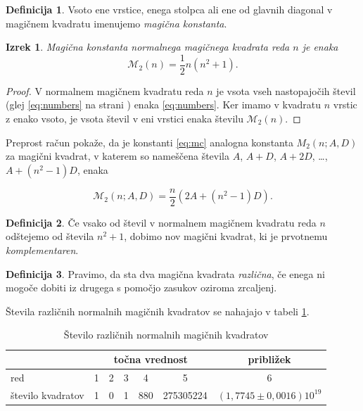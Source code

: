 \documentclass[a4paper,12pt]{article}
\newcommand{\m}{\mathcal{M}_2}
\theoremstyle{definition}
\newtheorem{definicija}{Definicija}
\theoremstyle{plain}
\newtheorem{izrek}{Izrek}
\begin{document}
\begin{definicija}
      Vsoto ene vrstice, enega stolpca ali ene od glavnih diagonal
      v magičnem kvadratu imenujemo \emph{magična konstanta}.
\end{definicija}

\begin{izrek}
   Magična konstanta normalnega magičnega kvadrata reda $n$
   je enaka
   \begin{equation}
      \label{eq:mc}%
      \m(n) = \frac{1}{2}n(n^2 + 1).
   \end{equation}
\end{izrek}

\begin{proof}
   V normalnem magičnem kvadratu reda \(n\) je vsota vseh nastopajočih
   števil (glej \ref{eq:numbers} na strani \pageref{eq:numbers}) enaka
   \ref{eq:numbers}. Ker imamo
   v kvadratu \(n\) vrstic z enako vsoto, je vsota števil v eni vrstici
   enaka številu \(\m(n)\). %
\end{proof}


Preprost račun pokaže, da je konstanti \ref{eq:mc} analogna konstanta
\(M_2(n;A,D)\) za magični kvadrat, v katerem so nameščena števila
\(A\), \(A+D\), \(A+2D\), \ldots, \(A+(n^2-1)D\), enaka %

\[
\m(n;A, D) = \frac{n}{2}\left(2A + (n^2-1)D\right).
\]
\begin{definicija}
      Če vsako od števil v normalnem magičnem kvadratu reda \(n\) odštejemo
      od števila \(n^2 + 1\), dobimo nov magični kvadrat, ki je prvotnemu
      \emph{komplementaren}.
\end{definicija}

\begin{definicija}
      Pravimo, da sta dva magična kvadrata \emph{različna}, če enega ni mogoče dobiti
      iz drugega s pomočjo zasukov oziroma zrcaljenj.
\end{definicija}

Števila različnih normalnih magičnih kvadratov se nahajajo v tabeli \ref{table:stevila}.

\begin{table}[!ht]
\centering
\begin{tabular}{lcccccc}
\toprule
& \multicolumn{5}{c}{točna vrednost} & približek \\
\midrule
red & 1 & 2 & 3 & 4 & 5 & 6 \\
število kvadratov & 1 & 0 & 1 & 880 & 275305224 & \( (1{,}7745 \pm 0{,}0016)10^{19} \) \\
\bottomrule
\end{tabular}
\caption{Število različnih normalnih magičnih kvadratov}
\label{table:stevila}
\end{table}
\end{document}
